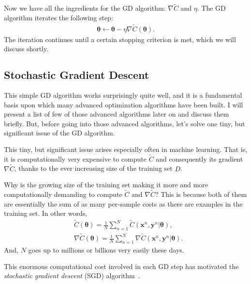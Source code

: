 \documentclass{report}
\newcommand{\vect}[1]{\mathbf{#1}}
\newcommand{\vects}[1]{\boldsymbol{#1}}
\newcommand{\vx}[0]{\vect{x}}
\newcommand{\vy}[0]{\vect{y}}
\newcommand{\TT}[0]{\vects{\theta}}
\begin{document}
Now we have all the ingredients for the GD algorithm: $\nabla \tilde{C}$ and
$\eta$. The GD algorithm iterates the following step:
\begin{align}
    \label{eq:GD}
    \TT \leftarrow \TT - \eta \nabla \tilde{C}(\TT).
\end{align}
The iteration continues until a certain stopping criterion is met, which we will
discuss shortly.

\subsection{Stochastic Gradient Descent}
\label{sec:sgd}

This simple GD algorithm works surprisingly quite well, and it is a fundamental
basis upon which many advanced optimization algorithms have been built. I will
present a list of few of those advanced algorithms later on and discuss them
briefly. But, before going into those advanced algorithms, let's solve one tiny,
but significant issue of the GD algorithm.

This tiny, but significant issue arises especially often in machine learning.
That is, it is computationally very expensive to compute $\tilde{C}$ and
consequently its gradient $\nabla \tilde{C}$, thanks to the ever increasing size
of the training set $D$. 

Why is the growing size of the training set making it more and more
computationally demanding to compute $\tilde{C}$ and $\nabla \tilde{C}$?  This
is because both of them are essentially the sum of as many per-sample costs as
there are examples in the training set. In other words,
\begin{align*}
    &\tilde{C}(\TT) = \frac{1}{N} \sum_{n=1}^N \tilde{C}(\vx^n, \vy^n | \TT), \\
    &\nabla \tilde{C}(\TT) = \frac{1}{N} \sum_{n=1}^N \nabla \tilde{C}(\vx^n, \vy^n | \TT).
\end{align*}
And, $N$ goes up to millions or billions very easily these days.

This enormous computational cost involved in each GD step has motivated the {\em
stochastic gradient descent} (SGD) algorithm~\cite{Robbins1951,Bottou1998}. 
\end{document}
